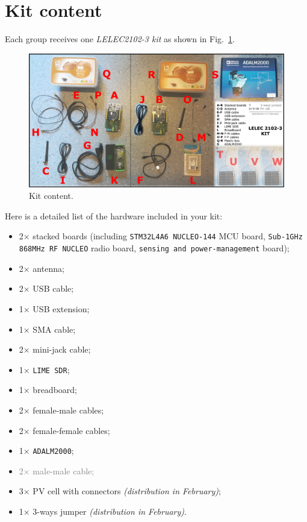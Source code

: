 \section*{Kit content}

Each group receives one \textit{LELEC2102-3 kit} as shown in Fig.~\ref{fig:kit-content}.

\begin{figure}[h!]
    \centering
    \includegraphics[width=1\textwidth]{figs/fig-contents.pdf}
    \caption{Kit content.}
    \label{fig:kit-content}
\end{figure}

Here is a detailed list of the hardware included in your kit:

\begin{itemize}
    \item 2$\times$ stacked boards (including \texttt{STM32L4A6 NUCLEO-144} MCU board, \texttt{Sub-1GHz 868MHz RF NUCLEO} radio board, \texttt{sensing and power-management} board);
    \item 2$\times$ antenna;
    \item 2$\times$ USB cable;
    \item 1$\times$ USB extension;
    \item 1$\times$ SMA cable;
    \item 2$\times$ mini-jack cable;
    \item 1$\times$ \texttt{LIME SDR};
    \item 1$\times$ breadboard;
    \item 2$\times$ female-male cables;
    \item 2$\times$ female-female cables;
    \item 1$\times$ \texttt{ADALM2000};
    \item \textcolor{gray}{2$\times$ male-male cable;}
    \item 3$\times$ PV cell with connectors \textit{(distribution in February)};
    \item 1$\times$ 3-ways jumper \textit{(distribution in February)}.

\end{itemize}

